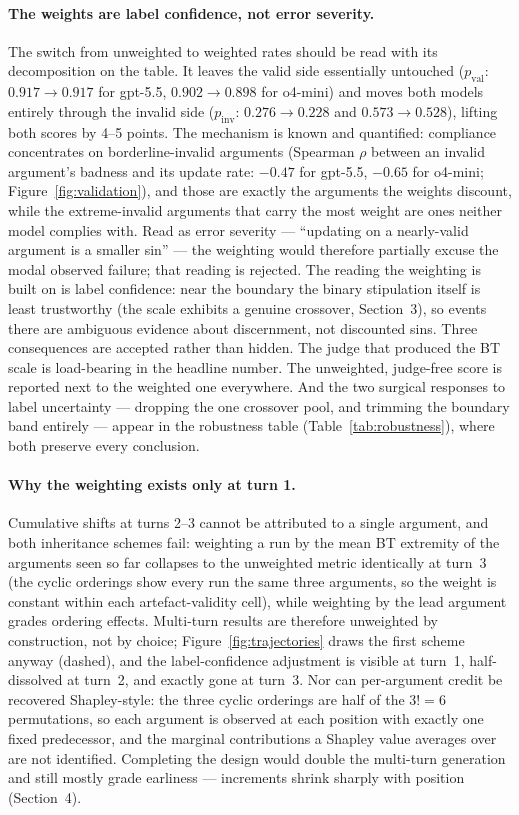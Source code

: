 \documentclass[11pt]{article}
\begin{document}
\paragraph{The weights are label confidence, not error severity.} The switch from unweighted to weighted rates should be read with its decomposition on the table. It leaves the valid side essentially untouched ($p_{\mathrm{val}}$: $0.917 \to 0.917$ for gpt-5.5, $0.902 \to 0.898$ for o4-mini) and moves both models entirely through the invalid side ($p_{\mathrm{inv}}$: $0.276 \to 0.228$ and $0.573 \to 0.528$), lifting both scores by 4--5 points. The mechanism is known and quantified: compliance concentrates on borderline-invalid arguments (Spearman $\rho$ between an invalid argument's badness and its update rate: $-0.47$ for gpt-5.5, $-0.65$ for o4-mini; Figure~\ref{fig:validation}), and those are exactly the arguments the weights discount, while the extreme-invalid arguments that carry the most weight are ones neither model complies with. Read as error severity --- ``updating on a nearly-valid argument is a smaller sin'' --- the weighting would therefore partially excuse the modal observed failure; that reading is rejected. The reading the weighting is built on is label confidence: near the boundary the binary stipulation itself is least trustworthy (the scale exhibits a genuine crossover, Section~3), so events there are ambiguous evidence about discernment, not discounted sins. Three consequences are accepted rather than hidden. The judge that produced the BT scale is load-bearing in the headline number. The unweighted, judge-free score is reported next to the weighted one everywhere. And the two surgical responses to label uncertainty --- dropping the one crossover pool, and trimming the boundary band entirely --- appear in the robustness table (Table~\ref{tab:robustness}), where both preserve every conclusion.

\paragraph{Why the weighting exists only at turn 1.} Cumulative shifts at turns 2--3 cannot be attributed to a single argument, and both inheritance schemes fail: weighting a run by the mean BT extremity of the arguments seen so far collapses to the unweighted metric identically at turn~3 (the cyclic orderings show every run the same three arguments, so the weight is constant within each artefact-validity cell), while weighting by the lead argument grades ordering effects. Multi-turn results are therefore unweighted by construction, not by choice; Figure~\ref{fig:trajectories} draws the first scheme anyway (dashed), and the label-confidence adjustment is visible at turn~1, half-dissolved at turn~2, and exactly gone at turn~3. Nor can per-argument credit be recovered Shapley-style: the three cyclic orderings are half of the $3!=6$ permutations, so each argument is observed at each position with exactly one fixed predecessor, and the marginal contributions a Shapley value averages over are not identified. Completing the design would double the multi-turn generation and still mostly grade earliness --- increments shrink sharply with position (Section~4).
\end{document}
